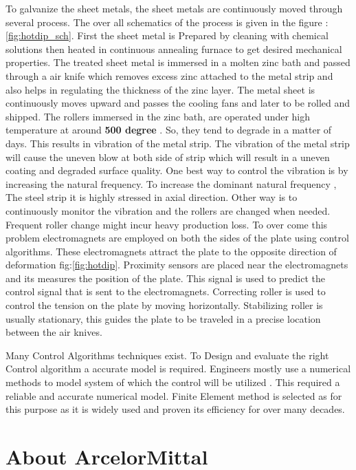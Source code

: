 \documentclass[main.tex]{subfiles}
\begin{document}
To galvanize the sheet metals,  the sheet metals are continuously moved through several process. The over all schematics of the process is given in the figure : \ref{fig:hotdip_sch}. First the sheet metal is Prepared by cleaning with chemical solutions then heated in continuous annealing furnace to get desired mechanical properties. The treated sheet metal is immersed in a molten zinc bath and passed through a air knife which removes excess zinc attached to the metal strip and also helps in regulating the thickness of the zinc  layer. The metal sheet is continuously moves upward and passes the cooling fans and later to be rolled and shipped. The rollers immersed in the zinc bath, are operated under high temperature at around \textbf{500 degree} . So, they tend to degrade in a matter of days. This results in vibration of the metal strip. The vibration of the metal strip will cause the uneven blow at both side of strip which will result in a uneven coating and degraded surface quality. One best way to control the vibration is by increasing the natural frequency. To increase the dominant natural frequency , The steel strip it is highly stressed in axial direction. Other way is to continuously monitor the vibration and the rollers are changed when needed. Frequent roller change might incur heavy production loss. To over come this problem electromagnets are employed on both the sides of the plate using control algorithms. These electromagnets attract the plate to the opposite direction of deformation fig:\ref{fig:hotdip}. Proximity sensors are placed near the electromagnets and its measures the position of the plate. This signal is used to predict the control signal that is sent to the electromagnets. Correcting roller is used to control the tension on the plate by moving horizontally.  Stabilizing roller is usually stationary, this guides the plate to be traveled in a precise location between the air knives. 

 
 Many Control Algorithms techniques exist. To Design and evaluate the right Control algorithm a accurate model is required.  Engineers mostly use a numerical methods to model system of which the control will be utilized . This required a reliable and accurate numerical model. Finite Element method is selected as for this purpose as it is widely used and proven its efficiency for over many decades. 




\section{About ArcelorMittal}
\end{document}
